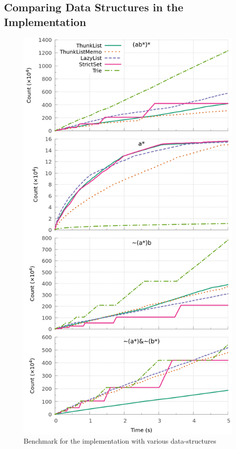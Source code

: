 \subsection{Comparing Data Structures in the \ocaml Implementation}
\label{sec:bench:ocaml}
\begin{figure}[!tb]
  \centering
  \includegraphics[width=0.95\linewidth]{measure/ocaml_all.png}
  \caption{Benchmark for the \ocaml implementation with various data-structures}
  \label{bench:ocaml:all}
  \label{bench:ocaml:union}
\end{figure}

